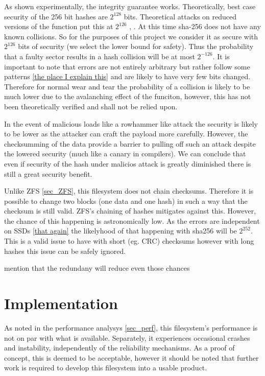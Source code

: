         As shown experimentally, the integrity guarantee works. Theoretically,
        best case security of the 256 bit hashes are $2^{128}$ bits.
        Theoretical attacks on reduced versions of the function put this at
        $2^{126}$ \cite{sha2_security}, \cite{sha2_analysis}. At this time
        sha-256 does not have any known collisions. So for the purposes of this
        project we consider it as secure with $2^{126}$ bits of security (we
        select the lower bound for safety).  Thus the probability that a faulty
        sector results in a hash collision will be at most $2^{-126}$. It is
        important to note that errors are not entirely arbitrary but rather
        follow some patterns \ref{the place I explain this} and are likely to
        have very few bits changed. Therefore for normal wear and tear the
        probability of a collision is likely to be much lower due to the
        avalanching effect of the funciton, however, this has not been
        theoretically verified and shall not be relied upon.

        In the event of malicious loads like a rowhammer like attack
        \cite{ssd_rowhammer} the security is likely to be lower as the attacker
        can craft the payload more carefully. However, the checksumming of the
        data provide a barrier to pulling off such an attack despite the
        lowered security (much like a canary in compilers). We can conclude
        that even if security of the hash under malicios attack is greatly
        diminished there is still a great security benefit.

        Unlike ZFS \ref{sec_ZFS}, this filesystem does not chain checksums.
        Therefore it is possible to change two blocks (one data and one hash)
        in such a way that the checksum is still valid. ZFS's chaining of
        hashes mitigates against this. However, the chance of this happening is
        astronomically low. As the errors are independent on SSDs \ref{that
        again} the likelyhood of that happening with sha256 will be $2^{252}$.
        This is a valid issue to have with short (eg. CRC) checksums however
        with long hashes this issue can be safely ignored.

        mention that the redundany will reduce even those chances

    \section{Implementation}

        As noted in the performance analysys \ref{sec_perf}, this filesystem's
        performance is not on par with what is available.  Separately, it
        experiences occasional crashes and instability, independently of the
        reliability mechanisms. As a proof of concept, this is deemed to be
        acceptable, however it should be noted that further work is required to
        develop this filesystem into a usable product.
